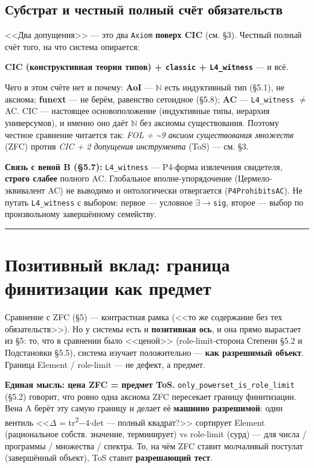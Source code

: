 \documentclass[11pt,a4paper]{article}
\begin{document}
\subsection{Субстрат и честный полный счёт обязательств}

<<Два допущения>> --- это два \texttt{Axiom} \textbf{поверх CIC} (см. \S{}3). Честный полный счёт того, на что система опирается:

\textbf{CIC (конструктивная теория типов) + \texttt{classic} + \texttt{L4\_\allowbreak{}witness}} --- и всё.

Чего в этом счёте нет и почему: \textbf{AoI} --- $\mathbb{N}$ есть индуктивный тип (\S{}5.1), не аксиома; \textbf{funext} --- не берём, равенство сетоидное (\S{}5.8); \textbf{AC} --- \texttt{L4\_\allowbreak{}witness} $\ne$ AC. CIC --- настоящее основоположение (индуктивные типы, иерархия универсумов), и именно оно даёт $\mathbb{N}$ без аксиомы существования. Поэтому честное сравнение читается так: \emph{FOL + \textasciitilde{}9 аксиом существования множеств} (ZFC) против \emph{CIC + 2 допущения инструмента} (ToS) --- см. \S{}3.

\textbf{Связь с веной B (\S{}5.7):} \texttt{L4\_\allowbreak{}witness} --- P4-форма извлечения свидетеля, \textbf{строго слабее} полного AC. Глобальное вполне-упорядочение (Цермело-эквивалент AC) не выводимо и онтологически отвергается (\texttt{P4Prohibits\allowbreak{}AC}). Не путать \texttt{L4\_\allowbreak{}witness} с выбором: первое --- условное \texttt{$\exists$$\to$sig}, второе --- выбор по произвольному завершённому семейству.

\bigskip\hrule\bigskip

\section{Позитивный вклад: граница финитизации как предмет}

Сравнение с ZFC (\S{}5) --- контрастная рамка (<<то же содержание без тех обязательств>>). Но у системы есть и \textbf{позитивная ось}, и она прямо вырастает из \S{}5: то, что в сравнении было <<ценой>> (role-limit-сторона Степени \S{}5.2 и Подстановки \S{}5.5), система изучает положительно --- \textbf{как разрешимый объект}. Граница Element / role-limit --- не дефект, а предмет.

\textbf{Единая мысль: цена ZFC = предмет ToS.} \texttt{only\_\allowbreak{}powerset\_\allowbreak{}is\_\allowbreak{}role\_\allowbreak{}limit} (\S{}5.2) говорит, что ровно одна аксиома ZFC пересекает границу финитизации. Вена A берёт эту самую границу и делает её \textbf{машинно разрешимой}: один вентиль <<$\Delta$ = tr\textsuperscript{2}$-$4$\cdot$det --- полный квадрат?>> сортирует Element (рациональное собств. значение, терминирует) vs role-limit (сурд) --- для числа / программы / множества / спектра. То, на чём ZFC ставит молчаливый постулат (завершённый объект), ToS ставит \textbf{разрешающий тест}.
\end{document}
